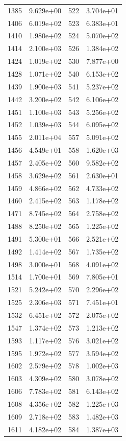 \documentclass[12pt]{article}
\begin{document}
\begin{longtable}{@{}cccc@{}}
1385 & 9.629e+00 & 522 & 3.704e+01 \\
1406 & 6.019e+02 & 523 & 6.383e+01 \\
1410 & 1.980e+02 & 524 & 5.070e+02 \\
1414 & 2.100e+03 & 526 & 1.384e+02 \\
1424 & 1.019e+02 & 530 & 7.877e+00 \\
1428 & 1.071e+02 & 540 & 6.153e+02 \\
1439 & 1.900e+03 & 541 & 5.237e+02 \\
1442 & 3.200e+02 & 542 & 6.106e+02 \\
1451 & 1.100e+03 & 543 & 5.256e+02 \\
1452 & 1.039e+03 & 544 & 6.095e+02 \\
1455 & 2.011e+04 & 557 & 5.091e+02 \\
1456 & 4.549e+01 & 558 & 1.620e+03 \\
1457 & 2.405e+02 & 560 & 9.582e+02 \\
1458 & 3.629e+02 & 561 & 2.630e+01 \\
1459 & 4.866e+02 & 562 & 4.733e+02 \\
1460 & 2.415e+02 & 563 & 1.178e+02 \\
1471 & 8.745e+02 & 564 & 2.758e+02 \\
1488 & 8.250e+02 & 565 & 1.225e+02 \\
1491 & 5.300e+01 & 566 & 2.521e+02 \\
1492 & 1.414e+02 & 567 & 1.735e+02 \\
1498 & 3.000e+01 & 568 & 4.091e+02 \\
1514 & 1.700e+01 & 569 & 7.805e+01 \\
1521 & 5.242e+02 & 570 & 2.296e+02 \\
1525 & 2.306e+03 & 571 & 7.451e+01 \\
1532 & 6.451e+02 & 572 & 2.075e+02 \\
1547 & 1.374e+02 & 573 & 1.213e+02 \\
1593 & 1.117e+02 & 576 & 3.021e+02 \\
1595 & 1.972e+02 & 577 & 3.594e+02 \\
1602 & 2.579e+02 & 578 & 1.002e+03 \\
1603 & 4.309e+02 & 580 & 3.078e+02 \\
1606 & 7.783e+02 & 581 & 6.143e+02 \\
1608 & 4.356e+02 & 582 & 1.225e+03 \\
1609 & 2.718e+02 & 583 & 1.482e+03 \\
1611 & 4.182e+02 & 584 & 1.387e+03 \\

\end{longtable}
\end{document}
